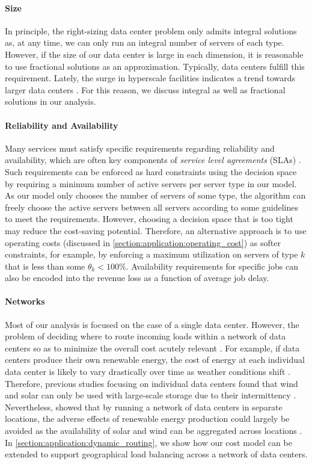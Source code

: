\paragraph{Size} In principle, the right-sizing data center problem only admits integral solutions as, at any time, we can only run an integral number of servers of each type. However, if the size of our data center is large in each dimension, it is reasonable to use fractional solutions as an approximation. Typically, data centers fulfill this requirement. Lately, the surge in hyperscale facilities indicates a trend towards larger data centers \cite{Jones2018}. For this reason, we discuss integral as well as fractional solutions in our analysis.

\paragraph{Reliability and Availability} Many services must satisfy specific requirements regarding reliability and availability, which are often key components of \emph{service level agreements} (SLAs) \cite{Lin2011}. Such requirements can be enforced as hard constraints using the decision space by requiring a minimum number of active servers per server type in our model. As our model only chooses the number of servers of some type, the algorithm can freely choose the active servers between all servers according to some guidelines to meet the requirements. However, choosing a decision space that is too tight may reduce the cost-saving potential. Therefore, an alternative approach is to use operating costs (discussed in \autoref{section:application:operating_cost}) as softer constraints, for example, by enforcing a maximum utilization on servers of type $k$ that is less than some $\theta_k < 100\%$. Availability requirements for specific jobs can also be encoded into the revenue loss as a function of average job delay.

\paragraph{Networks} Most of our analysis is focused on the case of a single data center. However, the problem of deciding where to route incoming loads within a network of data centers so as to minimize the overall cost acutely relevant \cite{Miller2021}. For example, if data centers produce their own renewable energy, the cost of energy at each individual data center is likely to vary drastically over time as weather conditions shift \cite{Lin2012}. Therefore, previous studies focusing on individual data centers found that wind and solar can only be used with large-scale storage due to their intermittency \cite{Gmach2010, Gmach2010_2}. Nevertheless, \citeauthor*{Lin2012} showed that by running a network of data centers in separate locations, the adverse effects of renewable energy production could largely be avoided as the availability of solar and wind can be aggregated across locations \cite{Lin2012}. In \autoref{section:application:dynamic_routing}, we show how our cost model can be extended to support geographical load balancing across a network of data centers.

